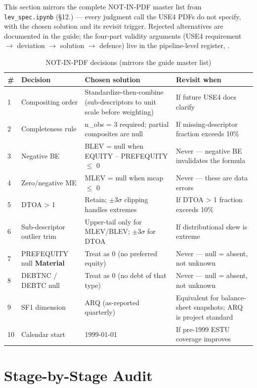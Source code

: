\documentclass[11pt,a4paper]{article}
\newcommand{\WARN}[1]{\textcolor{warn}{\textbf{#1}}}
\begin{document}
This section mirrors the complete NOT-IN-PDF master list from
\texttt{lev\_spec.ipynb} (\S12.) --- every judgment call the USE4 PDFs do not
specify, with the chosen solution and its revisit trigger. Rejected alternatives
are documented in the guide; the four-part validity arguments (USE4 requirement
$\to$ deviation $\to$ solution $\to$ defence) live in the pipeline-level
register, .

\begin{longtable}{@{}p{0.5cm}p{3.6cm}p{6.0cm}p{3.8cm}@{}}
\caption{NOT-IN-PDF decisions (mirrors the guide master list)}\\
\toprule
\textbf{\#} & \textbf{Decision} & \textbf{Chosen solution} & \textbf{Revisit when} \\
\midrule
\endhead
1 & Compositing order & Standardize-then-combine (sub-descriptors to unit scale before weighting) & If future USE4 docs clarify \\[3pt]
2 & Completeness rule & n\_obs = 3 required; partial composites are null & If missing-descriptor fraction exceeds 10\% \\[3pt]
3 & Negative BE & BLEV = null when EQUITY -- PREFEQUITY $\leq$ 0 & Never --- negative BE invalidates the formula \\[3pt]
4 & Zero/negative ME & MLEV = null when mcap $\leq$ 0 & Never --- these are data errors \\[3pt]
5 & DTOA > 1 & Retain; $\pm$3$\sigma$ clipping handles extremes & If DTOA > 1 fraction exceeds 10\% \\[3pt]
6 & Sub-descriptor outlier trim & Upper-tail only for MLEV/BLEV; $\pm$3$\sigma$ for DTOA & If distributional skew is extreme \\[3pt]
7 & PREFEQUITY null \WARN{Material} & Treat as 0 (no preferred equity) & Never --- null = absent, not unknown \\[3pt]
8 & DEBTNC / DEBTC null & Treat as 0 (no debt of that type) & Never --- null = absent, not unknown \\[3pt]
9 & SF1 dimension & ARQ (as-reported quarterly) & Equivalent for balance-sheet snapshots; ARQ is project standard \\[3pt]
10 & Calendar start & 1999-01-01 & If pre-1999 ESTU coverage improves \\[3pt]
\bottomrule
\end{longtable}

\section{Stage-by-Stage Audit}
\end{document}
